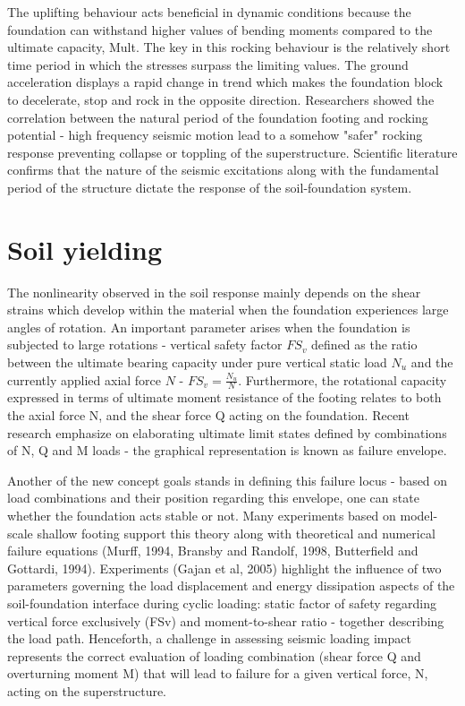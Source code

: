 \documentclass[10pt,a4paper]{report}
\begin{document}
The uplifting behaviour acts beneficial in dynamic conditions because the foundation can withstand higher values of bending moments compared to the ultimate capacity, Mult. The key in this rocking behaviour is the relatively short time period in which the stresses surpass the limiting values. The ground acceleration displays a rapid change in trend which makes the foundation block to decelerate, stop and rock in the opposite direction. Researchers showed the correlation between the natural period of the foundation footing and rocking potential - high frequency seismic motion lead to a somehow "safer" rocking response preventing collapse or toppling of the superstructure. Scientific literature confirms that the nature of the seismic excitations along with the fundamental period of the structure dictate the response of the soil-foundation system.

\section{Soil yielding}
The nonlinearity observed in the soil response mainly depends on the shear strains which develop within the material when the foundation experiences large angles of rotation. An important parameter arises when the foundation is subjected to large rotations - vertical safety factor $FS_v$ defined as the ratio between the ultimate bearing capacity under pure vertical static load $N_u$ and the currently applied axial force $N$ - $FS_v = \frac{N_u}{N}$. Furthermore, the rotational capacity expressed in terms of ultimate moment resistance of the footing relates to both the axial force N, and the shear force Q acting on the foundation. Recent research emphasize on elaborating ultimate limit states defined by combinations of N, Q and M loads - the graphical representation is known as failure envelope. 

Another of the new concept goals stands in defining this failure locus - based on load combinations and their position regarding this envelope, one can state whether the foundation acts stable or not. Many experiments based on model-scale shallow footing support this theory along with theoretical and numerical failure equations (Murff, 1994, Bransby and Randolf, 1998, Butterfield and Gottardi, 1994). Experiments (Gajan et al, 2005) highlight the influence of two parameters governing the load displacement and energy dissipation aspects of the soil-foundation interface during cyclic loading: static factor of safety regarding vertical force exclusively (FSv) and moment-to-shear ratio - together describing the load path. Henceforth, a challenge in assessing seismic loading impact represents the correct evaluation of loading combination (shear force Q and overturning moment M) that will lead to failure for a given vertical force, N, acting on the superstructure.
\end{document}
